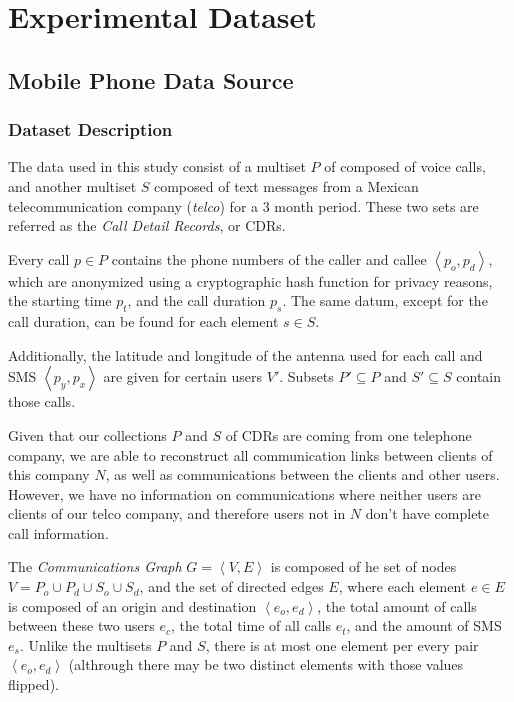 \section{Experimental Dataset}

\subsection{Mobile Phone Data Source}
\label{subsec:mobiledatasource}

\subsubsection{Dataset Description}

The data used in this study consist of a multiset $P$ of composed of voice calls, and another multiset $S$ composed of text messages from a Mexican telecommunication company (\textit{telco}) for a 3 month period. These two sets are referred as the \emph{Call Detail Records}, or CDRs.

Every call $p \in P$ contains the phone numbers of the caller and callee $\left< p_o, p_d \right>$, which are anonymized using a cryptographic hash function for privacy reasons, the starting time $p_t$, and the call duration $p_s$. The same datum, except for the call duration, can be found for each element $s \in S$.

Additionally, the latitude and longitude of the antenna used for each call and SMS $\left< p_y, p_x \right>$  are given for certain users $V'$. Subsets $P' \subseteq P$ and $S' \subseteq S$ contain those calls.

Given that our collections $P$ and $S$ of CDRs are coming from one telephone company, we are able to reconstruct all communication links between clients of this company $N$, as well as communications between the clients and other users. However, we have no information on communications where neither users are clients of our telco company, and therefore users not in $N$ don't have complete call information.

The \emph{Communications Graph} $G = \left< V, E \right>$ is composed of he set of nodes $V = P_o \cup P_d \cup S_o \cup S_d$, and the set of directed edges $E$, where each element $e \in E$ is composed of an origin and destination $\left< e_o, e_d \right>$, the total amount of calls between these two users $e_c$, the total time of all calls $e_t$, and the amount of SMS $e_s$. Unlike the multisets $P$ and $S$, there is at most one element per every pair $\left< e_o, e_d \right>$ (althrough there may be two distinct elements with those values flipped).

